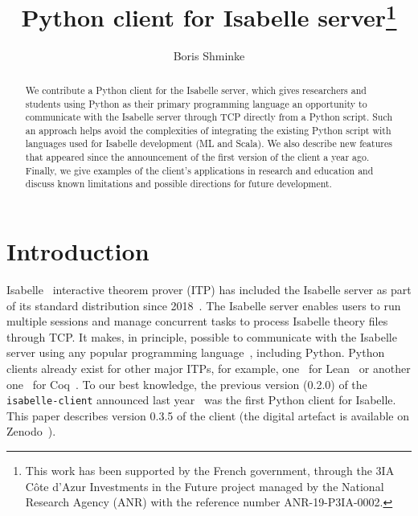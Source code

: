 \documentclass[runningheads]{llncs}
\begin{document}
\title{Python client for Isabelle server\thanks{This work has been supported by the French government, through the 3IA Côte d'Azur Investments in the Future project managed by the National Research Agency (ANR) with the reference number ANR-19-P3IA-0002.}}
%
%
\author{Boris Shminke}
\maketitle
                     
\begin{abstract}
We contribute a Python client for the Isabelle server, which gives researchers and students using Python as their primary programming language an opportunity to communicate with the Isabelle server through TCP directly from a Python script. Such an approach helps avoid the complexities of integrating the existing Python script with languages used for Isabelle development (ML and Scala). We also describe new features that appeared since the announcement of the first version of the client a year ago. Finally, we give examples of the client's applications in research and education and discuss known limitations and possible directions for future development.
                     
\end{abstract}
\section{Introduction}
Isabelle~\cite{DBLP:books/sp/NipkowPW02} interactive theorem prover (ITP) has included the Isabelle server as part of its standard distribution since 2018~\cite{IsabelleServer}. The Isabelle server enables users to run multiple sessions and manage concurrent tasks to process Isabelle theory files through TCP. It makes, in principle, possible to communicate with the Isabelle server using any popular programming language~\cite{TIOBEIndex}, including Python. Python clients already exist for other major ITPs, for example, one~\cite{LeanClient} for Lean~\cite{10.1007/978-3-030-79876-5_37} or another one~\cite{CoqClient} for Coq~\cite{the_coq_development_team_2022_5846982}. To our best knowledge, the previous version (0.2.0) of the \texttt{isabelle-client} announced last year~\cite{DBLP:conf/mkm/LiskaLNRSSSW21} was the first Python client for Isabelle. This paper describes version 0.3.5 of the client (the digital artefact is available on Zenodo~\cite{boris_shminke_2022_6490275}).
\end{document}
